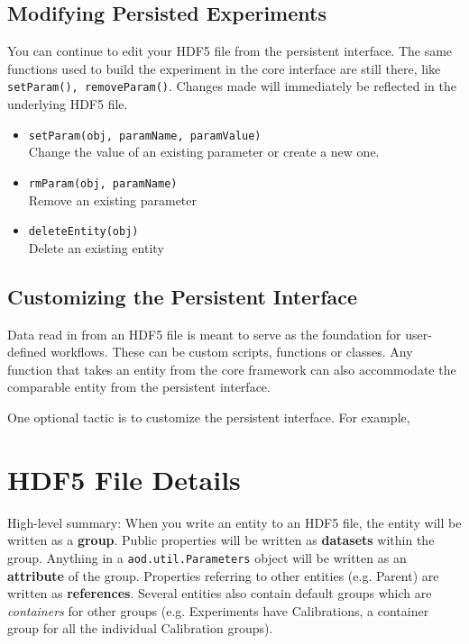 \documentclass[10pt]{exam}
\newcommand\aodclass[1]{\textcolor{codeblue}{\texttt{#1}}}
\newcommand\aodfcn[1]{\textcolor{darkteal}{\texttt{#1}}}
\begin{document}
	\subsection{Modifying Persisted Experiments}
	\noindent You can continue to edit your HDF5 file from the persistent interface. The same functions used to build the experiment in the core interface are still there, like \aodfcn{setParam(), removeParam()}. Changes made will immediately be reflected in the underlying HDF5 file. 
	
	\begin{itemize}
		\item \aodfcn{setParam(obj, paramName, paramValue)}\\
		Change the value of an existing parameter or create a new one. 
		\item \aodfcn{rmParam(obj, paramName)}\\
		Remove an existing parameter
		\item \aodfcn{deleteEntity(obj)}\\
		Delete an existing entity
	\end{itemize}

	\subsection{Customizing the Persistent Interface}
	\noindent Data read in from an HDF5 file is meant to serve as the foundation for user-defined workflows. These can be custom scripts, functions or classes. Any function that takes an entity from the core framework can also accommodate the comparable entity from the persistent interface. 
	
	One optional tactic is to customize the persistent interface. For example,  

\section{HDF5 File Details}
	\label{section:HDF5_Details}
	\noindent High-level summary: When you write an entity to an HDF5 file, the entity will be written as a \textbf{group}. Public properties will be written as  \textbf{datasets} within the group. Anything in a \aodclass{aod.util.Parameters} object will be written as an \textbf{attribute} of the group. Properties referring to other entities (e.g. Parent) are written as \textbf{references}.  Several entities also contain default groups which are \textit{containers} for other groups (e.g. Experiments have Calibrations, a container group for all the individual Calibration groups). 
	
\end{document}
